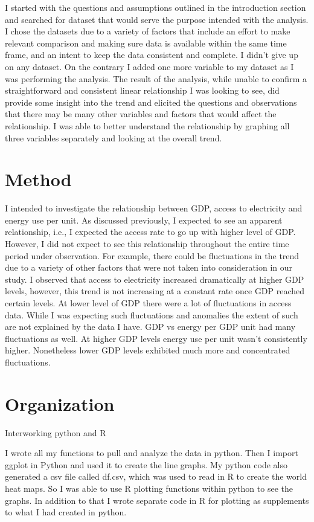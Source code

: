 \documentclass{article}
\begin{document}
I started with the questions and assumptions outlined in the introduction section and searched for dataset that would serve the purpose intended with the analysis. I chose the datasets due to a variety of factors that include an effort to make relevant comparison and making sure data is available within the same time frame, and an intent to keep the data consistent and complete. I didn’t give up on any dataset. On the contrary I added one more variable to my dataset as I was performing the analysis. The result of the analysis, while unable to confirm a straightforward and consistent linear relationship I was looking to see, did provide some insight into the trend and elicited the questions and observations that there may be many other variables and factors that would affect the relationship. I was able to better understand the relationship by graphing all three variables separately and looking at the overall trend. 

\section{Method}

I intended to investigate the relationship between GDP, access to electricity and energy use per unit. As discussed previously, I expected to see an apparent relationship, i.e., I expected the access rate to go up with higher level of GDP. However, I did not expect to see this relationship throughout the entire time period under observation. For example, there could be fluctuations in the trend due to a variety of other factors that were not taken into consideration in our study. I observed that access to electricity increased dramatically at higher GDP levels, however, this trend is not increasing at a constant rate once GDP reached certain levels. At lower level of GDP there were a lot of fluctuations in access data. While I was expecting such fluctuations and anomalies the extent of such are not explained by the data I have. GDP vs energy per GDP unit had many fluctuations as well. At higher GDP levels energy use per unit wasn’t consistently higher. Nonetheless lower GDP levels exhibited much more and concentrated fluctuations. 

\section{Organization}

Interworking python and R 

I wrote all my functions to pull and analyze the data in python. Then I import ggplot in Python and used it to create the line graphs. My python code also generated a csv file called df.csv, which was used to read in R to create the world heat maps. So I was able to use R plotting functions within python to see the graphs. In addition to that I wrote separate code in R for plotting as supplements to what I had created in python. 
\end{document}
